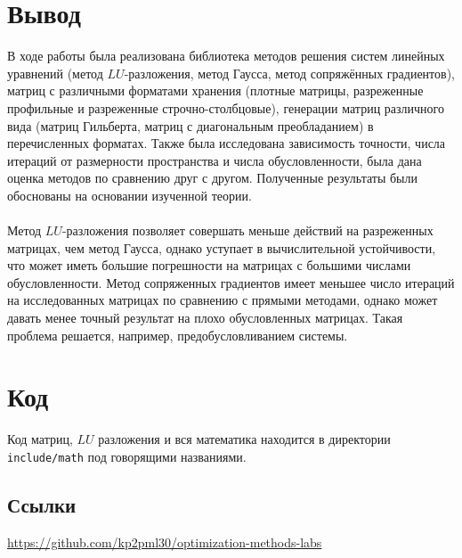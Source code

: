 \documentclass[russian, english]{article}
\begin{document}
\section{Вывод}
В ходе работы была реализована библиотека методов решения систем линейных уравнений (метод $LU$-разложения, метод Гаусса, метод сопряжённых градиентов), матриц с различными форматами хранения (плотные матрицы, разреженные профильные и разреженные строчно-столбцовые), генерации матриц различного вида (матриц Гильберта, матриц с диагональным преобладанием) в перечисленных форматах. Также была исследована зависимость точности, числа итераций от размерности пространства и числа обусловленности, была дана оценка методов по сравнению друг с другом. Полученные результаты были обоснованы на основании изученной теории. \\\\
Метод $LU$-разложения позволяет совершать меньше действий на разреженных матрицах, чем метод Гаусса, однако уступает в вычислительной устойчивости, что может иметь большие погрешности на матрицах с большими числами обусловленности. Метод сопряженных градиентов имеет меньшее число итераций на исследованных матрицах по сравнению с прямыми методами, однако может давать менее точный результат на плохо обусловленных матрицах. Такая проблема решается, например, предобусловливанием системы.


\newpage
\appendix
\section{Код}
Код матриц, $LU$ разложения и вся математика находится в директории \texttt{include/math} под говорящими названиями.
\subsection{Ссылки}
\url{https://github.com/kp2pml30/optimization-methods-labs}
\end{document}
